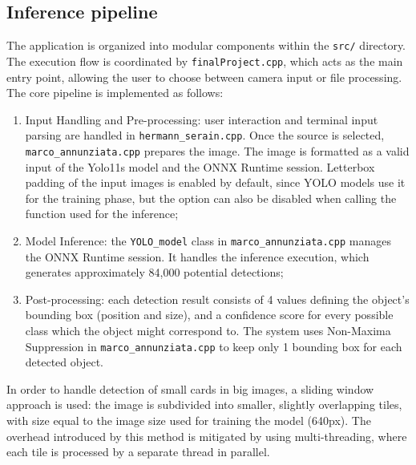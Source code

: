 \subsection{Inference pipeline}
The application is organized into modular components within the \texttt{src/} directory. The execution flow 
is coordinated by \texttt{finalProject.cpp}, which acts as the main entry point, allowing the user to choose between camera 
input or file processing. The core pipeline is implemented as follows:
\begin{enumerate}
    \item Input Handling and Pre-processing: user interaction and terminal input parsing are handled in \texttt{hermann\_serain.cpp}. 
    Once the source is selected, \texttt{marco\_annunziata.cpp} prepares the image. The image is formatted as a valid input of the 
    Yolo11s model and the ONNX Runtime session. Letterbox padding of the input images is enabled by default, since YOLO models use 
    it for the training phase, but the option can also be disabled when calling the function used for the inference;
    \item Model Inference: the \texttt{YOLO\_model} class in \texttt{marco\_annunziata.cpp} manages the ONNX Runtime session. 
    It handles the inference execution, which generates approximately 84,000 potential detections;
    \item Post-processing: each detection result consists of 4 values defining the object's bounding box (position and size), and 
    a confidence score for every possible class which the object might correspond to. The system uses Non-Maxima Suppression in 
    \texttt{marco\_annunziata.cpp} to keep only 1 bounding box for each detected object.
\end{enumerate}
In order to handle detection of small cards in big images, a sliding window approach is used: the image is subdivided into smaller, slightly 
overlapping tiles, with size equal to the image size used for training the model (640px). The overhead introduced by this method is mitigated 
by using multi-threading, where each tile is processed by a separate thread in parallel.

